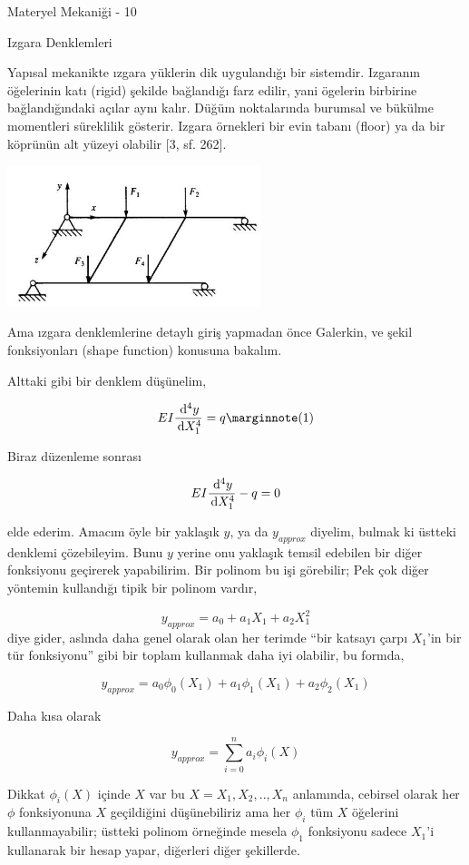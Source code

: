 \documentclass[12pt,fleqn]{article}\usepackage{../../common}
\begin{document}
Materyel Mekaniği - 10

Izgara Denklemleri

Yapısal mekanikte ızgara yüklerin dik uygulandığı bir sistemdir. Izgaranın
öğelerinin katı (rigid) şekilde bağlandığı farz edilir, yani ögelerin birbirine
bağlandığındaki açılar aynı kalır. Düğüm noktalarında burumsal ve bükülme
momentleri süreklilik gösterir. Izgara örnekleri bir evin tabanı (floor) ya da
bir köprünün alt yüzeyi olabilir [3, sf. 262].

\includegraphics[width=20em]{compscieng_bpp43fem_01.jpg}

Ama ızgara denklemlerine detaylı giriş yapmadan önce Galerkin, ve şekil
fonksiyonları (shape function) konusuna bakalım.

Alttaki gibi bir denklem düşünelim,

$$
E I \frac{\ud^4 y}{\ud X_1^4} = q
\mlabel{1}
$$

Biraz düzenleme sonrası

$$
E I \frac{\,\mathrm{d}^4 y}{\,\mathrm{d} X_1^4} - q = 0
$$

elde ederim. Amacım öyle bir yaklaşık $y$, ya da $y_{approx}$ diyelim, bulmak ki
üstteki denklemi çözebileyim. Bunu $y$ yerine onu yaklaşık temsil edebilen bir
diğer fonksiyonu geçirerek yapabilirim. Bir polinom bu işi görebilir; Pek çok
diğer yöntemin kullandığı tipik bir polinom vardır,

$$
y_{approx} = a_0 + a_1 X_1 + a_2 X_1^2 
$$
diye gider, aslında daha genel olarak olan her terimde ``bir katsayı çarpı
$X_1$'in bir tür fonksiyonu'' gibi bir toplam kullanmak daha iyi olabilir,
bu formda,

$$
y_{approx} = a_0 \phi_0(X_1) + a_1 \phi_1(X_1) + a_2 \phi_2(X_1) 
$$

Daha kısa olarak

$$
y_{approx} = \sum_{i=0}^{n} a_i \phi_i(X) 
$$

Dikkat $\phi_i(X)$ içinde $X$ var bu $X = X_1,X_2,..,X_n$ anlamında, cebirsel
olarak her $\phi$ fonksiyonuna $X$ geçildiğini düşünebiliriz ama her $\phi_i$
tüm $X$ öğelerini kullanmayabilir; üstteki polinom örneğinde mesela $\phi_1$
fonksiyonu sadece $X_1$'i kullanarak bir hesap yapar, diğerleri diğer şekillerde.
\end{document}
